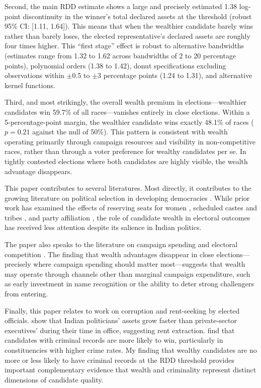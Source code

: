 \documentclass[12pt]{article}
\begin{document}
Second, the main RDD estimate shows a large and precisely estimated 1.38 log-point discontinuity in the winner's total declared assets at the threshold (robust 95\% CI: [1.11, 1.64]). This means that when the wealthier candidate barely wins rather than barely loses, the elected representative's declared assets are roughly four times higher. This ``first stage'' effect is robust to alternative bandwidths (estimates range from 1.32 to 1.62 across bandwidths of 2 to 20 percentage points), polynomial orders (1.38 to 1.42), donut specifications excluding observations within $\pm$0.5 to $\pm$3 percentage points (1.24 to 1.31), and alternative kernel functions.

Third, and most strikingly, the overall wealth premium in elections---wealthier candidates win 59.7\% of all races---vanishes entirely in close elections. Within a 5-percentage-point margin, the wealthier candidate wins exactly 48.1\% of races ($p = 0.21$ against the null of 50\%). This pattern is consistent with wealth operating primarily through campaign resources and visibility in non-competitive races, rather than through a voter preference for wealthy candidates per se. In tightly contested elections where both candidates are highly visible, the wealth advantage disappears.

This paper contributes to several literatures. Most directly, it contributes to the growing literature on political selection in developing democracies \citep{besley2005political, pande2003can, chattopadhyay2004women, bhalotra2014health}. While prior work has examined the effects of reserving seats for women \citep{chattopadhyay2004women, iyer2012effects}, scheduled castes and tribes \citep{pande2003can, jensenius2015power}, and party affiliation \citep{asher2017politics}, the role of candidate wealth in electoral outcomes has received less attention despite its salience in Indian politics.

The paper also speaks to the literature on campaign spending and electoral competition \citep{gerber1998estimating, levitt1994using, stratmann2005some}. The finding that wealth advantages disappear in close elections---precisely where campaign spending should matter most---suggests that wealth may operate through channels other than marginal campaign expenditure, such as early investment in name recognition or the ability to deter strong challengers from entering.

Finally, this paper relates to work on corruption and rent-seeking by elected officials. \citet{fisman2014corruption} show that Indian politicians' assets grow faster than private-sector executives' during their time in office, suggesting rent extraction. \citet{prakash2019improving} find that candidates with criminal records are more likely to win, particularly in constituencies with higher crime rates. My finding that wealthy candidates are no more or less likely to have criminal records at the RDD threshold provides important complementary evidence that wealth and criminality represent distinct dimensions of candidate quality.
\end{document}
